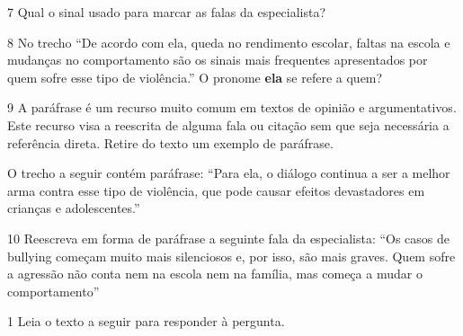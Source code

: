 {

\num{7} Qual o sinal usado para marcar as falas da especialista?


\num{8} No trecho ``De acordo com ela, queda no rendimento escolar, faltas na
escola e mudanças no comportamento são os sinais mais frequentes
apresentados por quem sofre esse tipo de violência.'' O pronome \textbf{ela} se
refere a quem?


\num{9} A paráfrase é um recurso muito comum em textos de opinião e
argumentativos. Este recurso visa a reescrita de alguma fala ou
citação sem que seja necessária a referência direta. Retire do texto
um exemplo de paráfrase.

O trecho a seguir contém paráfrase: ``Para ela, o diálogo continua a ser a
melhor arma contra esse tipo de violência, que pode causar efeitos devastadores
em crianças e adolescentes.''}

\num{10} Reescreva em forma de paráfrase a seguinte fala da especialista: ``Os 
casos de bullying começam muito mais silenciosos e, por isso, são mais graves. 
Quem sofre a agressão não conta nem na escola nem na família, mas começa a mudar 
o comportamento''



\num{1} Leia o texto a seguir para responder à pergunta.

